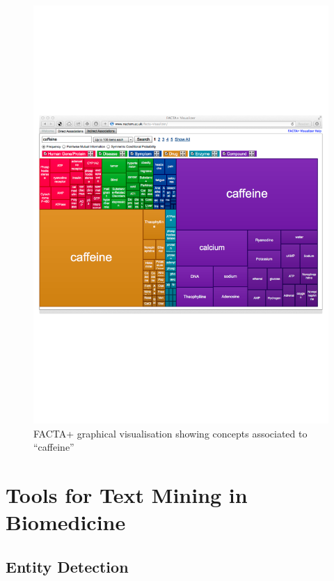 \begin{figure}
\begin{center}
\includegraphics[scale=0.6]{figures/facta-vis.pdf}
 \caption{FACTA+ graphical visualisation showing concepts associated to ``caffeine'' }
\label{fig:facta-vis}
\end{center}
\end{figure}




\section{Tools for Text Mining in Biomedicine}
\label{sec:tools-tm}

\subsection{Entity Detection}

